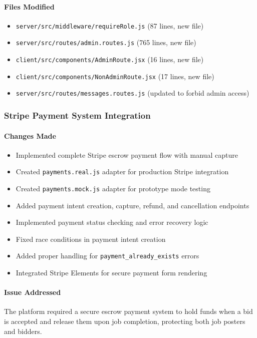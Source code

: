 \documentclass[11pt]{article}
\begin{document}
\paragraph{Files Modified}
\begin{itemize}[leftmargin=1.4em]
  \item \texttt{server/src/middleware/requireRole.js} (87 lines, new file)
  \item \texttt{server/src/routes/admin.routes.js} (765 lines, new file)
  \item \texttt{client/src/components/AdminRoute.jsx} (16 lines, new file)
  \item \texttt{client/src/components/NonAdminRoute.jsx} (17 lines, new file)
  \item \texttt{server/src/routes/messages.routes.js} (updated to forbid admin access)
\end{itemize}

\subsubsection{Stripe Payment System Integration}
\paragraph{Changes Made}
\begin{itemize}[leftmargin=1.4em]
  \item Implemented complete Stripe escrow payment flow with manual capture
  \item Created \texttt{payments.real.js} adapter for production Stripe integration
  \item Created \texttt{payments.mock.js} adapter for prototype mode testing
  \item Added payment intent creation, capture, refund, and cancellation endpoints
  \item Implemented payment status checking and error recovery logic
  \item Fixed race conditions in payment intent creation
  \item Added proper handling for \texttt{payment\_already\_exists} errors
  \item Integrated Stripe Elements for secure payment form rendering
\end{itemize}

\paragraph{Issue Addressed}
The platform required a secure escrow payment system to hold funds when a bid is accepted and release them upon job completion, protecting both job posters and bidders.
\end{document}
